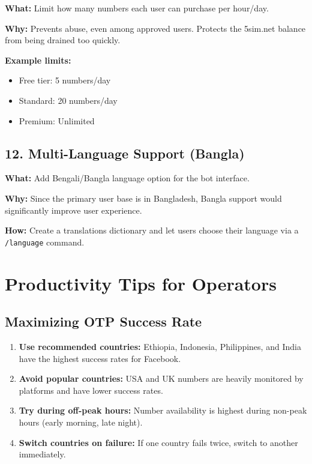 \textbf{What:} Limit how many numbers each user can purchase per hour/day.

\textbf{Why:} Prevents abuse, even among approved users. Protects the 5sim.net balance from being drained too quickly.

\textbf{Example limits:}
\begin{itemize}
    \item Free tier: 5 numbers/day
    \item Standard: 20 numbers/day
    \item Premium: Unlimited
\end{itemize}

\subsection{12. Multi-Language Support (Bangla)}

\textbf{What:} Add Bengali/Bangla language option for the bot interface.

\textbf{Why:} Since the primary user base is in Bangladesh, Bangla support would significantly improve user experience.

\textbf{How:} Create a translations dictionary and let users choose their language via a \texttt{/language} command.

\section{Productivity Tips for Operators}

\subsection{Maximizing OTP Success Rate}

\begin{enumerate}
    \item \textbf{Use recommended countries:} Ethiopia, Indonesia, Philippines, and India have the highest success rates for Facebook.
    \item \textbf{Avoid popular countries:} USA and UK numbers are heavily monitored by platforms and have lower success rates.
    \item \textbf{Try during off-peak hours:} Number availability is highest during non-peak hours (early morning, late night).
    \item \textbf{Switch countries on failure:} If one country fails twice, switch to another immediately.
\end{enumerate}

